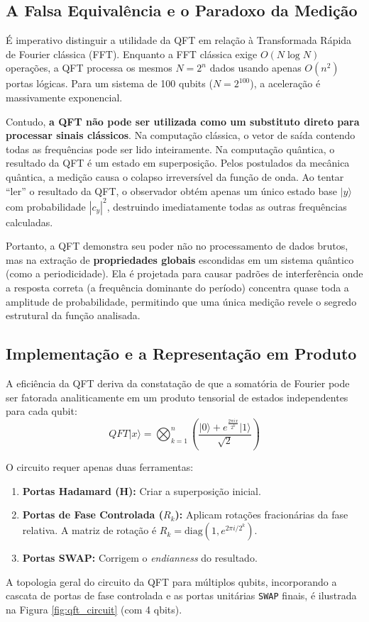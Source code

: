 \documentclass[12pt, a4paper]{article}
\newcommand{\ket}[1]{\lvert #1 \rangle}
\begin{document}
\subsection{A Falsa Equivalência e o Paradoxo da Medição}

É imperativo distinguir a utilidade da QFT em relação à Transformada Rápida de Fourier clássica (FFT). Enquanto a FFT clássica exige $O(N \log N)$ operações, a QFT processa os mesmos $N = 2^n$ dados usando apenas $O(n^2)$ portas lógicas. Para um sistema de 100 qubits ($N = 2^{100}$), a aceleração é massivamente exponencial.

Contudo, \textbf{a QFT não pode ser utilizada como um substituto direto para processar sinais clássicos}. Na computação clássica, o vetor de saída contendo todas as frequências pode ser lido inteiramente. Na computação quântica, o resultado da QFT é um estado em superposição. Pelos postulados da mecânica quântica, a medição causa o colapso irreversível da função de onda. Ao tentar ``ler'' o resultado da QFT, o observador obtém apenas um único estado base $\ket{y}$ com probabilidade $|c_y|^2$, destruindo imediatamente todas as outras frequências calculadas.

Portanto, a QFT demonstra seu poder não no processamento de dados brutos, mas na extração de \textbf{propriedades globais} escondidas em um sistema quântico (como a periodicidade). Ela é projetada para causar padrões de interferência onde a resposta correta (a frequência dominante do período) concentra quase toda a amplitude de probabilidade, permitindo que uma única medição revele o segredo estrutural da função analisada. 

\subsection{Implementação e a Representação em Produto}

A eficiência da QFT deriva da constatação de que a somatória de Fourier pode ser fatorada analiticamente em um produto tensorial de estados independentes para cada qubit:
\begin{equation}
    QFT\ket{x} = \bigotimes_{k = 1}^n\left(\frac{\ket{0} + e^{\frac{2\pi i x}{2^k}}\ket{1}}{\sqrt{2}}\right)
\end{equation}

O circuito requer apenas duas ferramentas:
\begin{enumerate}
    \item \textbf{Portas Hadamard (H):} Criar a superposição inicial.
    \item \textbf{Portas de Fase Controlada ($R_k$):} Aplicam rotações fracionárias da fase relativa. A matriz de rotação é $R_k = \text{diag}(1, e^{2\pi i / 2^k})$.
    \item \textbf{Portas SWAP:} Corrigem o \emph{endianness} do resultado.
\end{enumerate}
A topologia geral do circuito da QFT para múltiplos qubits, incorporando a cascata de portas de fase controlada e as portas unitárias \texttt{SWAP} finais, é ilustrada na Figura \ref{fig:qft_circuit} (com 4 qbits).
\end{document}
